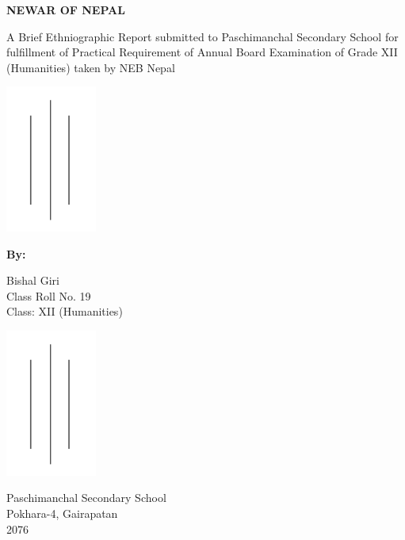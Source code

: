 \documentclass[a4paper,13pt, margin=0.9in]{article}
\begin{document}
\begin{titlepage}
    \centering
    {\bfseries\Large
        NEWAR OF NEPAL\\
        \vskip1cm 
  
    
    } 
    A Brief Ethniographic Report submitted to Paschimanchal Secondary School for fulfillment of Practical Requirement of Annual Board Examination of Grade XII (Humanities) taken by NEB Nepal   
    \vskip1cm 
    
    
    \includegraphics[width=3cm]{sample.png}
    \vskip1cm 
   
    \textbf{By:}
   
     Bishal Giri\\
     Class Roll No. 19 \\
     Class: XII (Humanities)
    
     \vskip0.5cm 
     
     \includegraphics[width=3cm]{sample.png}
     
     \vskip0.5cm 
     
     Paschimanchal Secondary School \\
     Pokhara-4, Gairapatan \\
     2076
\end{titlepage}
\end{document}
